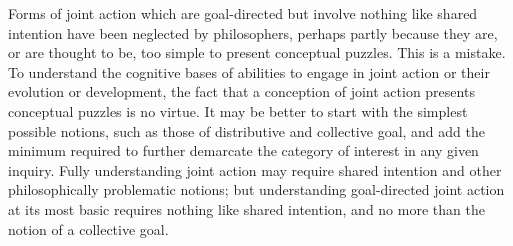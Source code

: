 \documentclass[12pt,a4paper]{extarticle}
\begin{document}
Forms of joint action which are goal-directed but involve nothing like shared intention have been neglected by philosophers, perhaps 
partly because they are, or are thought to be, too simple to present conceptual puzzles.
This is a mistake.  
To understand the cognitive bases of abilities to engage in joint action or their evolution or development, the fact that a conception of joint action presents conceptual puzzles is no virtue.
It may be better to start with the simplest possible notions, such as those of distributive and collective goal, and add the minimum required to further demarcate the category of interest in any given inquiry.
Fully understanding joint action may require shared intention and other philosophically problematic notions; but
understanding goal-directed joint action at its most basic requires nothing like shared intention, and no more than the notion of a collective goal.


\end{document}
